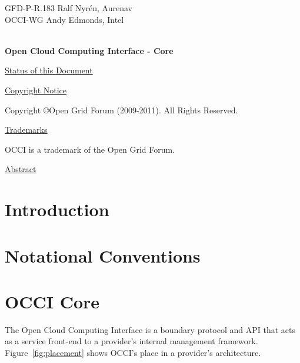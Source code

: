 \documentclass[10pt,a4paper]{article}
\begin{document}
\thispagestyle{empty}

GFD-P-R.183 \hfill  {Ralf Nyrén, Aurenav}\\
OCCI-WG \hfill  Andy Edmonds, Intel\\
\\

\vspace*{0.5in}

\begin{Large}
\textbf{Open Cloud Computing Interface - Core}
\end{Large}

\vspace*{0.5in}

\underline{Status of this Document}



\underline{Copyright Notice}

Copyright \copyright Open Grid Forum (2009-2011). All Rights Reserved.

\underline{Trademarks}

OCCI is a trademark of the Open Grid Forum.

\underline{Abstract}



\newpage
\tableofcontents
\newpage

\section{Introduction}


\section{Notational Conventions}


\section{OCCI Core}
The Open Cloud Computing Interface is a boundary protocol and API that
acts as a service front-end to a provider's internal management
framework. Figure~\ref{fig:placement} shows OCCI's place in a
provider's architecture.
\end{document}
